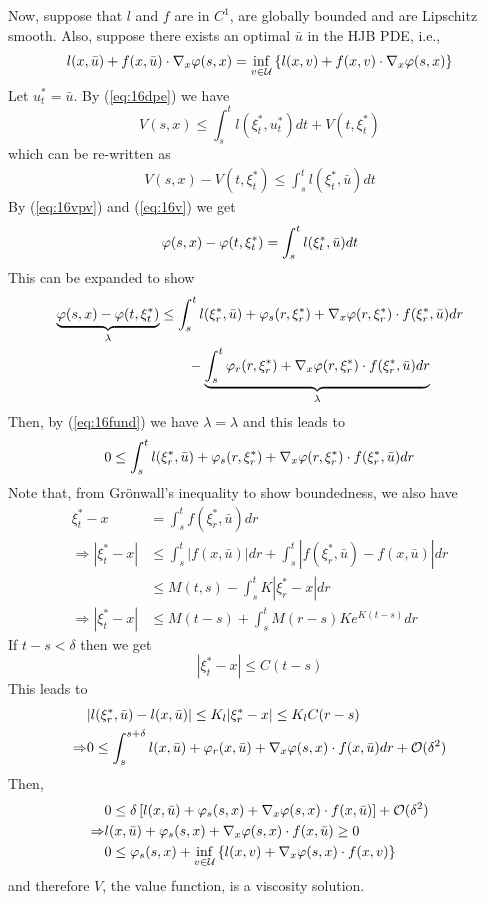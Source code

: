 Now, suppose that $l$ and $f$ are in $C^1$, are globally bounded and are Lipschitz smooth. Also, suppose there exists an optimal $\bar{u}$ in the HJB PDE, i.e.,
\begin{align}
\label{eq:16ubar}
l(x,\bar{u})+f(x,\bar{u})\cdot\nabla_x\varphi(s,x) = \inf_{v\in\mathcal{U}}\left\lbrace l(x,v)+f(x,v)\cdot\nabla_x\varphi(s,x)\right\rbrace
\end{align}
Let $u_t^\ast=\bar{u}$. By (\ref{eq:16dpe}) we have
$$V(s,x)\leq\int_s^tl(\xi_t^\ast,u_t^\ast)dt+V(t,\xi_t^\ast)$$
which can be re-written as
\begin{align}
\label{eq:16v}
V(s,x)-V(t,\xi_t^\ast)\leq\int_s^tl(\xi_t^\ast,\bar{u})dt
\end{align}
By (\ref{eq:16vpv}) and (\ref{eq:16v}) we get
$$\varphi(s,x)-\varphi(t,\xi_t^\ast) = \int_s^tl(\xi_t^\ast,\bar{u})dt$$
This can be expanded to show
\begin{align*}
\underbrace{\varphi(s,x) - \varphi(t,\xi_t^\ast)}_{\lambda} &\leq \int_s^tl(\xi_r^\ast,\bar{u}) + \varphi_s(r,\xi_r^\ast) + \nabla_x\varphi(r,\xi_r^\ast)\cdot f(\xi_r^\ast,\bar{u})dr \\
&\qquad - \underbrace{\int_s^t\varphi_r(r,\xi_r^\ast) + \nabla_x\varphi(r,\xi_r^\ast)\cdot f(\xi_r^\ast,\bar{u})dr}_{\lambda}
\end{align*}
Then, by (\ref{eq:16fund}) we have $\lambda=\lambda$ and this leads to
$$0\leq\int_s^tl(\xi_r^\ast,\bar{u}) + \varphi_s(r,\xi_r^\ast) + \nabla_x\varphi(r,\xi_r^\ast)\cdot f(\xi_r^\ast,\bar{u})dr$$
Note that, from Gr\"onwall's inequality to show boundedness, we also have
\begin{align*}
\xi_t^\ast-x &= \int_s^tf(\xi_r^\ast,\bar{u})dr \\
\Rightarrow |\xi_t^\ast-x| &\leq \int_s^t|f(x,\bar{u})|dr + \int_s^t|f(\xi_r^\ast,\bar{u})-f(x,\bar{u})|dr \\
&\leq M(t,s)-\int_s^tK|\xi_r^\ast-x|dr \\
\Rightarrow |\xi_t^\ast-x| &\leq M(t-s) + \int_s^tM(r-s)Ke^{K(t-s)}dr
\end{align*}
If $t-s<\delta$ then we get
$$|\xi_t^\ast-x|\leq C(t-s)$$
This leads to
\begin{align*}
&|l(\xi_r^\ast,\bar{u}) - l(x,\bar{u})| \leq K_l|\xi_r^\ast-x| \leq K_lC(r-s) \\
\Rightarrow &0 \leq \int_s^{s+\delta}l(x,\bar{u})+\varphi_r(x,\bar{u})+\nabla_x\varphi(s,x)\cdot f(x,\bar{u})dr + \mathcal{O}(\delta^2)
\end{align*}
Then,
\begin{align*}
&0 \leq \delta\left[ l(x,\bar{u})+\varphi_s(s,x)+\nabla_x\varphi(s,x)\cdot f(x,\bar{u})\right] + \mathcal{O}(\delta^2) \\
\Rightarrow &l(x,\bar{u}) + \varphi_s(s,x) + \nabla_x\varphi(s,x)\cdot f(x,\bar{u}) \geq 0 \\
&0 \leq \varphi_s(s,x) + \inf_{v\in\mathcal{U}}\left\lbrace l(x,v) + \nabla_x\varphi(s,x)\cdot f(x,v)\right\rbrace \\
\end{align*}
and therefore $V$, the value function, is a viscosity solution.

